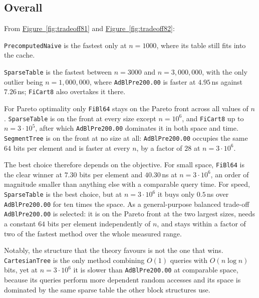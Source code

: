 \documentclass[a4paper,UKenglish,cleveref,thm-restate]{lipics-v2021}
\begin{document}
\subsection{Overall}
From \hyperref[fig:tradeoff81]{Figure~\ref*{fig:tradeoff81}} and \hyperref[fig:tradeoff82]{Figure~\ref*{fig:tradeoff82}}:

\texttt{PrecomputedNaive} is the fastest only at $n = 1000$, where its table still fits into the cache.

\texttt{SparseTable} is the fastest between $n = 3000$ and $n = 3{,}000{,}000$, with the only outlier being $n = 1{,}000{,}000$, where \texttt{AdBlPre200.00} is faster at $4.95$\,ns against $7.26$\,ns; \texttt{FiCart8} also overtakes it there.

For Pareto optimality only \texttt{FiBl64} stays on the Pareto front across all values of $n$.
\texttt{SparseTable} is on the front at every size except $n = 10^6$, and \texttt{FiCart8} up to $n = 3 \cdot 10^5$, after which \texttt{AdBlPre200.00} dominates it in both space and time.
\texttt{SegmentTree} is on the front at no size at all: \texttt{AdBlPre200.00} occupies the same $64$ bits per element and is faster at every $n$, by a factor of $28$ at $n = 3 \cdot 10^6$.

The best choice therefore depends on the objective.
For small space, \texttt{FiBl64} is the clear winner at $7.30$ bits per element and $40.30$\,ns at $n = 3 \cdot 10^6$, an order of magnitude smaller than anything else with a comparable query time.
For speed, \texttt{SparseTable} is the best choice, but at $n = 3 \cdot 10^6$ it buys only $0.5$\,ns over \texttt{AdBlPre200.00} for ten times the space.
As a general-purpose balanced trade-off \texttt{AdBlPre200.00} is selected: it is on the Pareto front at the two largest sizes, needs a constant $64$ bits per element independently of $n$, and stays within a factor of two of the fastest method over the whole measured range.

Notably, the structure that the theory favours is not the one that wins.
\texttt{CartesianTree} is the only method combining $O(1)$ queries with $O(n \log n)$ bits, yet at $n = 3 \cdot 10^6$ it is slower than \texttt{AdBlPre200.00} at comparable space, because its queries perform more dependent random accesses and its space is dominated by the same sparse table the other block structures use.
\end{document}
